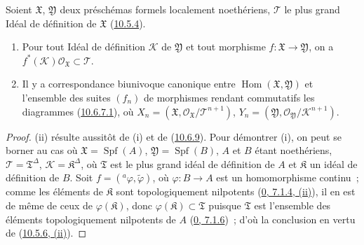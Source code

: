 \begin{corollary}[10.6.10]
\label{I.10.6.10-fr}
Soient $\mathfrak{X}$, $\mathfrak{Y}$ deux préschémas formels
localement noethériens, $\mathscr{T}$ le plus grand Idéal de définition
de $\mathfrak{X}$ (\hyperref[I.10.5.4-fr]{10.5.4}).
\begin{enumerate}
  \item[\rm{(i)}] Pour tout Idéal de définition $\mathscr{K}$ de
  $\mathfrak{Y}$ et tout morphisme
  $f:\mathfrak{X}\to\mathfrak{Y}$, on a
  $f^*(\mathscr{K})\mathscr{O}_{\mathfrak{X}}\subset\mathscr{T}$.
  \item[\rm{(ii)}] Il y a correspondance biunivoque canonique entre
  $\operatorname{Hom}(\mathfrak{X},\mathfrak{Y})$ et l'ensemble des
  suites $(f_n)$ de morphismes rendant commutatifs les diagrammes
  (\hyperref[I.10.6.7.1-fr]{10.6.7.1}), où
  $X_n=(\mathfrak{X},
  \mathscr{O}_{\mathfrak{X}}/\mathscr{T}^{n+1})$,
  $Y_n=(\mathfrak{Y},
  \mathscr{O}_{\mathfrak{Y}}/\mathscr{K}^{n+1})$.
\end{enumerate}
\end{corollary}

\begin{proof}
(ii) résulte aussitôt de (i) et de
(\hyperref[I.10.6.9-fr]{10.6.9}). Pour démontrer (i), on peut se borner
au cas où $\mathfrak{X}=\operatorname{Spf}(A)$,
$\mathfrak{Y}=\operatorname{Spf}(B)$, $A$ et $B$ étant noethériens,
$\mathscr{T}=\mathfrak{T}^\Delta$,
$\mathscr{K}=\mathfrak{K}^\Delta$, où $\mathfrak{T}$ est le plus grand
idéal de définition de $A$ et $\mathfrak{K}$ un idéal de définition de
$B$. Soit $f=({}^a\varphi,\widetilde{\varphi})$, où
$\varphi:B\to A$ est un homomorphisme continu~; comme les éléments de
$\mathfrak{K}$ sont topologiquement nilpotents
(\hyperref[0.7.1.4-fr]{0, 7.1.4, (ii)}), il en est de même de ceux de
$\varphi(\mathfrak{K})$, donc
$\varphi(\mathfrak{K})\subset\mathfrak{T}$ puisque $\mathfrak{T}$ est
l'ensemble des éléments topologiquement nilpotents de $A$
(\hyperref[0.7.1.6-fr]{0, 7.1.6})~; d'où la conclusion en vertu de
(\hyperref[I.10.5.6-fr]{10.5.6, (ii)}).
\end{proof}

